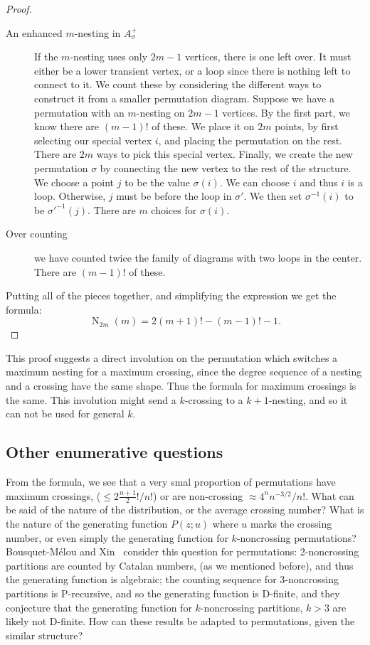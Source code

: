 \documentclass{amsart}
\begin{document}
\begin{proof}
\begin{description}
\item[An enhanced $m$-nesting in $A_\sigma^{+}$]
If the $m$-nesting uses only $2m-1$ vertices, there is one left over. It must either be a lower transient vertex, or a loop since there is nothing left to connect to it. 
We count these by considering the different ways to construct it from a smaller permutation diagram. Suppose we have a 
permutation with an $m$-nesting on $2m-1$ vertices. By the first part, we know there are $(m-1)!$ of these.
We place it on $2m$ points, by first selecting our special vertex
$i$, and placing the permutation on the rest. There are $2m$ ways to
pick this special vertex. Finally, we create the new permutation $\sigma$ by
connecting the new vertex to the rest of the structure. We choose a
point $j$ to be the value $\sigma(i)$. We can choose $i$ and thus $i$
is a loop. Otherwise, $j$ must be before the loop in $\sigma'$. We then set $\sigma^{-1}(i)$
to be $\sigma'^{-1}(j)$. There are $m$ choices for $\sigma(i)$. 

\item[Over counting] we have counted twice the family of diagrams with two loops in
the center. There are $(m-1)!$ of these. 
\end{description}
Putting all of the pieces
together, and simplifying the expression we get the formula: \[\operatorname{N}_{2m}(m)= 2(m+1)!-(m-1)!-1.\]
\end{proof}

This proof suggests a direct involution on the permutation which switches a maximum nesting for a maximum crossing, since the degree sequence of a nesting and a crossing have the same shape. Thus the formula for maximum crossings is the same. This involution might send a $k$-crossing to a $k+1$-nesting, and so it can not be used for general $k$. 

\subsection{Other enumerative questions} 
From the formula, we see that a very smal proportion of permutations have maximum crossings, ($\leq 2\frac{n+1}{2}!/n!$)
or are non-crossing $\approx 4^nn^{-3/2}/n!$. What can be said of the nature of the distribution, or the average crossing number? What is the nature of the generating function $P(z;u)$ where $u$ marks the crossing number, or even simply the generating function for $k$-noncrossing permutations? Bousquet-M\'elou and Xin~\cite{BoXi05} consider this question for permutations: 2-noncrossing partitions are counted by Catalan numbers, (as we mentioned before), and thus the generating function is algebraic; the counting sequence for 3-noncrossing partitions is P-recursive, and so the generating function is D-finite, and they conjecture that the generating function for $k$-noncrossing partitions, $k>3$ are likely not D-finite. How can these results be adapted to permutations, given the similar structure?
\end{document}

